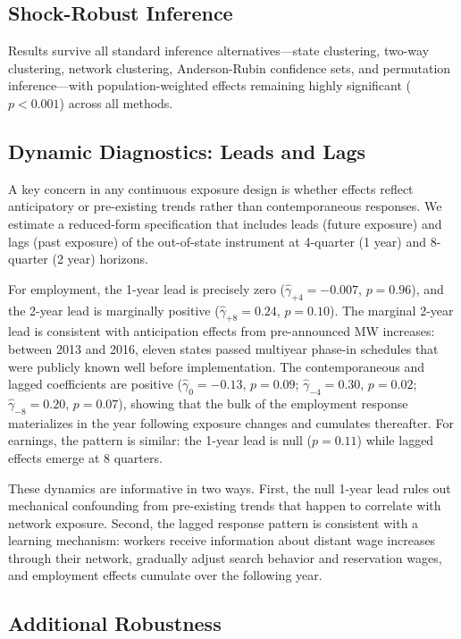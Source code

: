 \documentclass[12pt]{article}
\begin{document}
\subsection{Shock-Robust Inference}

Results survive all standard inference alternatives---state clustering, two-way clustering, network clustering, Anderson-Rubin confidence sets, and permutation inference---with population-weighted effects remaining highly significant ($p < 0.001$) across all methods.

\subsection{Dynamic Diagnostics: Leads and Lags}

A key concern in any continuous exposure design is whether effects reflect anticipatory or pre-existing trends rather than contemporaneous responses. We estimate a reduced-form specification that includes leads (future exposure) and lags (past exposure) of the out-of-state instrument at 4-quarter (1 year) and 8-quarter (2 year) horizons.

For employment, the 1-year lead is precisely zero ($\hat{\gamma}_{+4} = -0.007$, $p = 0.96$), and the 2-year lead is marginally positive ($\hat{\gamma}_{+8} = 0.24$, $p = 0.10$). The marginal 2-year lead is consistent with anticipation effects from pre-announced MW increases: between 2013 and 2016, eleven states passed multiyear phase-in schedules that were publicly known well before implementation. The contemporaneous and lagged coefficients are positive ($\hat{\gamma}_0 = -0.13$, $p = 0.09$; $\hat{\gamma}_{-4} = 0.30$, $p = 0.02$; $\hat{\gamma}_{-8} = 0.20$, $p = 0.07$), showing that the bulk of the employment response materializes in the year following exposure changes and cumulates thereafter. For earnings, the pattern is similar: the 1-year lead is null ($p = 0.11$) while lagged effects emerge at 8 quarters.

These dynamics are informative in two ways. First, the null 1-year lead rules out mechanical confounding from pre-existing trends that happen to correlate with network exposure. Second, the lagged response pattern is consistent with a learning mechanism: workers receive information about distant wage increases through their network, gradually adjust search behavior and reservation wages, and employment effects cumulate over the following year.

\subsection{Additional Robustness}
\end{document}
